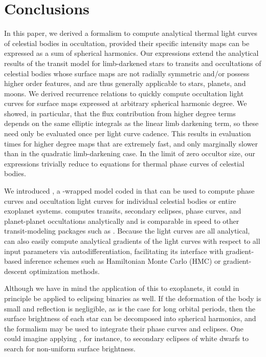 \documentclass[modern]{aastex61}
\begin{document}
\section{Conclusions}
\label{sec:conclusions}

In this paper, we derived a formalism to compute analytical thermal light curves of celestial
bodies in occultation, provided their specific intensity maps can be expressed as a sum
of spherical harmonics. Our expressions extend the analytical results of the
\citet{MandelAgol2002} transit model for limb-darkened stars to transits and
occultations of celestial bodies whose surface maps are not radially symmetric
and/or possess higher order features, and are thus generally applicable to
stars, planets, and moons. We derived recurrence relations to quickly compute
occultation light curves for surface maps expressed at arbitrary spherical harmonic degree.
We showed, in particular, that the flux contribution from higher degree terms
depends on the same elliptic integrals as the linear limb darkening term,
so these need only be evaluated once per light curve cadence. This results in
evaluation times for higher degree maps that are extremely fast, and
only marginally slower than in the quadratic limb-darkening case.
In the limit of zero occultor size, our expressions trivially reduce to equations
for thermal phase curves of celestial bodies.

We introduced \starry, a \Python-wrapped model coded in \cpp
that can be used to compute phase curves and occultation light curves for
individual celestial bodies or entire exoplanet systems. \starry computes
transits, secondary eclipses, phase curves, and planet-planet occultations
analytically and is comparable in speed to other transit-modeling packages such
as \batman \citep{Kreidberg2015}. Because the light curves are all analytical,
\starry can also easily compute analytical gradients of the light curves with respect
to all input parameters via autodifferentiation, facilitating its interface with
gradient-based inference schemes such as Hamiltonian Monte Carlo (HMC)
or gradient-descent optimization methods.

Although we have in mind the application of this \starry to exoplanets, it could
in principle be applied to eclipsing binaries as well.  If the deformation of
the body is small and reflection is negligible, as is the case for long orbital periods,
then the surface brightness of each star can be decomposed into spherical harmonics,
and the \starry formalism may be used to integrate their phase curves and eclipses.
One could imagine applying \starry, for instance, to secondary eclipses of white
dwarfs to search for non-uniform surface brightness.
\end{document}
